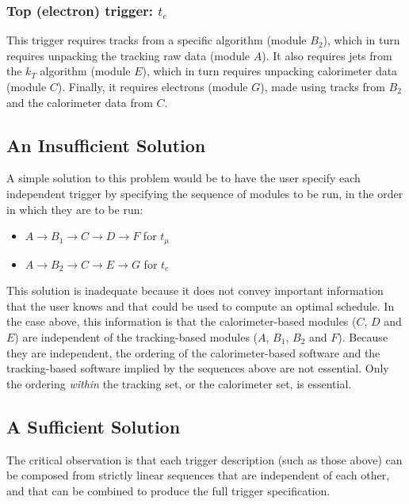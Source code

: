 \documentclass[draftmode]{memarticle}
\begin{document}
\subsubsection{\texorpdfstring{Top (electron) trigger: $t_{e}$}{Top (electron) trigger}}

This trigger requires tracks from a specific algorithm (module $B_2$),
which in turn requires unpacking the tracking raw data (module $A$).
It also requires jets from the $k_T$ algorithm (module $E$),
which in turn requires unpacking calorimeter data (module $C$).
Finally, it requires electrons (module $G$),
made using tracks from $B_2$ and the calorimeter data from $C$.

\subsection{An Insufficient Solution}

A simple solution to this problem
would be to have the user specify each independent trigger
by specifying the sequence of modules to be run,
in the order in which they are to be run:
\begin{itemize}
\item $A \rightarrow B_1 \rightarrow C \rightarrow D \rightarrow F$ for $t_\mu$
\item $A \rightarrow B_2 \rightarrow C \rightarrow E \rightarrow G$ for $t_e$
\end{itemize}

This solution is inadequate
because it does not convey important information that the user knows
and that could be used to compute an optimal schedule.
In the case above,
this information is that the calorimeter-based modules ($C$, $D$ and $E$)
are independent of the tracking-based modules ($A$, $B_1$, $B_2$ and $F$).
Because they are independent,
the ordering of the calorimeter-based software
and the tracking-based software
implied by the sequences above
are not essential.
Only the ordering \emph{within} the tracking set,
or the calorimeter set,
is essential.

\subsection{A Sufficient Solution}\label{sec:hltgrammar}

The critical observation is that each trigger description
(such as those above)
can be composed from strictly linear sequences
that are independent of each other,
and that can be combined to produce the full trigger specification.
\end{document}
